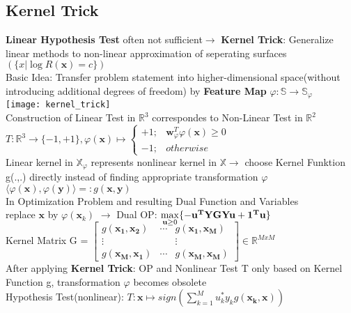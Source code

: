 \begin{sectionbox}
	\subsection{Kernel Trick}
	\textbf{Linear Hypothesis Test} often not sufficient$\rightarrow$ \textbf{Kernel Trick}: Generalize linear methods to non-linear approximation of seperating surfaces $(\{x|\log R(\mathbf{x})=c\})$ \\
	Basic Idea: Transfer problem statement into higher-dimensional space(without introducing additional degrees of freedom) by \textbf{Feature Map} $\varphi: \mathbb{S}\rightarrow\mathbb{S}_{\varphi}$
	\\ 
 \texttt{[image: kernel\_trick]} \\
 Construction of Linear Test in $\mathbb{R}^3$ correspondes to Non-Linear Test in $\mathbb{R}^2$\\
 $\boxed{T:\mathbb{R}^3\rightarrow\{-1,+1\},\varphi(\mathbf{x})\mapsto \begin{cases} +1 ;&\mathbf{w}_{\varphi}^T\varphi(\mathbf{x})\geq0\\
 -1;&otherwise \end{cases}}$ \\
	Linear kernel in $\mathbb{X}_\varphi$ represents nonlinear kernel in $\mathbb{X} \rightarrow$ choose Kernel Funktion g(.,.) directly instead of finding appropriate transformation $\varphi$  \\
	$\boxed{\langle\varphi(\mathbf{x}),\varphi(\mathbf{y})\rangle=:g(\mathbf{x,y})}$ \\

	In Optimization Problem and resulting Dual Function and Variables \\replace $\mathbf{x}$ by $\varphi(\mathbf{x}_k)$ $\rightarrow$ Dual OP: $\smash{\displaystyle\max_{\mathbf{u}\geq0}}\{-\mathbf{u^TYGYu +1^Tu}\}\\$ \\
	Kernel Matrix G = $\begin{bmatrix}
		g(\mathbf{x_1,x_2}) &\cdots& g(\mathbf{x_1,x_M}) \\
		\vdots&&\vdots \\
		g(\mathbf{x_M,x_1}) &\cdots& g(\mathbf{x_M,x_M}) 
	\end{bmatrix} \in \mathbb{R}^{MxM}$ \\
	After applying \textbf{Kernel Trick}: OP and Nonlinear Test T only based on Kernel Function g, transformation $\varphi$ becomes obsolete\\
	Hypothesis Test(nonlinear): $\boxed{T:\mathbf{x}\mapsto sign(\sum_{k=1}^{M}u_k^*y_kg(\mathbf{x_k,x}))}$\\

\end{sectionbox}
